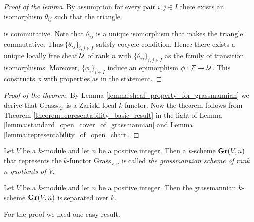 \begin{proof}[Proof of the lemma]
By assumption for every pair $i,j\in I$ there exists an isomorphism $\theta_{ij}$ such that the triangle
\begin{center}
\end{center}
is commutative. Note that $\theta_{ij}$ is a unique isomorphism that makes the triangle commutative. Thus $\{\theta_{ij}\}_{i,j\in I}$ satisfy cocycle condition. Hence there exists a unique locally free sheaf ${\mathcal U}$ of rank $n$ with $\{\theta_{ij}\}_{i,j\in I}$ as the family of transition isomorphisms. Moreover, $\{\phi_i\}_{i\in I}$ induce an epimorphism $\phi:{\mathcal F}\twoheadrightarrow {\mathcal U}$. This constructs $\phi$ with properties as in the statement.
\end{proof}

\begin{proof}[Proof of the theorem]
By Lemma \ref{lemma:sheaf_property_for_grassmannian} we derive that $\mathrm{Grass}_{V.n}$ is a Zariski local $k$-functor. Now the theorem follows from Theorem \ref{theorem:representability_basic_result} in the light of Lemma \ref{lemma:standard_open_cover_of_grassmannian} and Lemma \ref{lemma:representability_of_open_chart}.
\end{proof}

\begin{definition}
Let $V$ be a $k$-module and let $n$ be a positive integer. Then a $k$-scheme $\mathbf{Gr}(V,n)$ that represents the $k$-functor $\mathrm{Grass}_{V,n}$ is called \textit{the grassmannian scheme of rank $n$ quotients of $V$}.
\end{definition}

\begin{theorem}\label{theorem:separatedness_of_grassmannian}
Let $V$ be a $k$-module and let $n$ be a positive integer. Then the grassmannian $k$-scheme $\mathbf{Gr}(V,n)$ is separated over $k$.
\end{theorem}
\noindent
For the proof we need one easy result.

